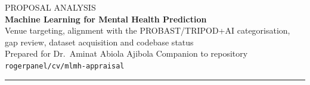 \documentclass[11pt,a4paper]{article}
\begin{document}
\begin{center}
{\sffamily\footnotesize\color{softgrey}\MakeUppercase{Proposal analysis}}\\[0.8em]
{\sffamily\LARGE\bfseries Machine Learning for Mental Health Prediction}\\[0.3em]
{\sffamily\large Venue targeting, alignment with the PROBAST/TRIPOD+AI categorisation,\\ gap review, dataset acquisition and codebase status}\\[0.8em]
{\footnotesize\color{softgrey}Prepared for Dr.\ Aminat Abiola Ajibola \quad\textbullet\quad Companion to repository \texttt{rogerpanel/cv/mlmh-appraisal}}
\end{center}
\vspace{0.3em}\hrule\vspace{1em}
\end{document}
